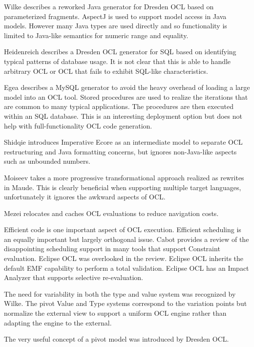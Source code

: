 \documentclass{sig-alternate}
\begin{document}
Wilke\cite{Dresden/JavaCG} describes a reworked  Java generator for Dresden OCL based on parameterized fragments.
AspectJ is used to support model access in Java models. However many Java types are used directly and so functionality is limited to Java-like semantics for numeric range and equality.

Heidenreich\cite{QueryCode} describes a Dresden OCL generator for SQL based on identifying typical patterns of database usage. It is not clear that this is able to handle arbitrary OCL or OCL that fails to exhibit SQL-like characteristics.

Egea\cite{MySQL4OCL} describes a MySQL generator to avoid the heavy overhead of loading a large model into an OCL tool. Stored procedures are used to realize the iterations that are common to many typical applications. The procedures are then executed within an SQL database. This is an interesting deployment option but does not help with full-functionality OCL code generation.

Shidqie\cite{Shidqie} introduces Imperative Ecore as an intermediate model to separate OCL restructuring and Java formatting concerns, but ignores non-Java-like aspects such as unbounded numbers.

Moiseev\cite{rodion-models2009} takes a more progressive transformational approach realized as rewrites in Maude. This is clearly beneficial when supporting multiple target languages, unfortunately it ignores the awkward aspects of OCL.

Mezei\cite{OCL-relocation} relocates and caches OCL evaluations to reduce navigation costs.

Efficient code is one important aspect of OCL execution. Efficient scheduling is an equally important
but largely orthogonal issue. 
Cabot\cite{Constraint-Survey} provides a review of the disappointing scheduling
support in many tools that support Constraint evaluation.
Eclipse OCL was overlooked in the review. Eclipse OCL inherits the default EMF capability
to perform a total validation. Eclipse OCL has an Impact Analyzer that supports selective re-evaluation.

The need for variability in both the type and value system was recognized by Wilke\cite{Variability}. The pivot Value
and Type systems correspond to the variation points but normalize the external view to support a uniform OCL engine rather than adapting the engine to the external.

The very useful concept of a pivot\cite{Pivot} model was introduced by Dresden OCL.
\end{document}
